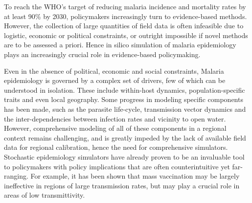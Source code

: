 \documentclass{article}
\begin{document}

To reach the WHO’s target of reducing malaria incidence and mortality rates by at least 90\% by 2030, policymakers increasingly turn to evidence-based methods. 
However, the collection of large quantities of field data is often infeasible due to logistic, economic or political constraints, or outright impossible if novel methods are to be assessed a priori. 
Hence in silico simulation of malaria epidemiology plays an increasingly crucial role in evidence-based policymaking.

Even in the absence of political, economic and social constraints, Malaria epidemiology is governed by a complex set of drivers, few of which can be understood in isolation.
These include within-host dynamics, population-specific traits and even local geography.
Some progress in modeling specific components has been made, such as the parasite life-cycle, transmission vector dynamics and the inter-dependencies between infection rates and vicinity to open water. 
However, comprehensive modeling of all of these components in a regional context remains challenging, and is greatly impeded by the lack of available field data for regional calibration, hence the need for comprehensive simulators.
Stochastic epidemiology simulators have already proven to be an invaluable tool to policymakers with policy implications that are often counterintuitive yet far-ranging. 
For example, it has been shown that mass vaccination may be largely ineffective in regions of large transmission rates, but may play a crucial role in areas of low transmittivity.
\end{document}
